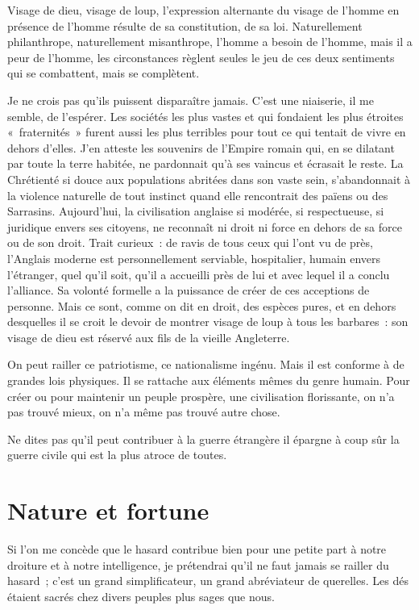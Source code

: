 \documentclass[french,twoside]{book} %
\begin{document}
\noindent Visage de dieu, visage de loup, l’expression alternante du visage de l’homme en présence de l’homme résulte de sa constitution, de sa loi. Naturellement philanthrope, naturellement misanthrope, l’homme a besoin de l’homme, mais il a peur de l’homme, les circonstances règlent seules le jeu de ces deux sentiments qui se combattent, mais se complètent.\par
Je ne crois pas qu’ils puissent disparaître jamais. C’est une niaiserie, il me semble, de l’espérer. Les sociétés les plus vastes et qui fondaient les plus étroites « fraternités » furent aussi les plus terribles pour tout ce qui tentait de vivre en dehors d’elles. J’en atteste les souvenirs de l’Empire romain qui, en se dilatant par toute la terre habitée, ne pardonnait qu’à ses vaincus et écrasait le reste. La Chrétienté si douce aux populations abritées dans son vaste sein, s’abandonnait à la violence naturelle de tout instinct quand elle rencontrait des païens ou des Sarrasins. Aujourd’hui, la civilisation anglaise si modérée, si respectueuse, si juridique envers ses citoyens, ne reconnaît ni droit ni force en dehors de sa force ou de son droit. Trait curieux : de ravis de tous ceux qui l’ont vu de près, l’Anglais moderne est personnellement serviable, hospitalier, humain envers l’étranger, quel qu’il soit, qu’il a accueilli près de lui et avec lequel il a conclu l’alliance. Sa volonté formelle a la puissance de créer de ces acceptions de personne. Mais ce sont, comme on dit en droit, des espèces pures, et en dehors desquelles il se croit le devoir de montrer visage de loup à tous les barbares : son visage de dieu est réservé aux fils de la vieille Angleterre.\par
On peut railler ce patriotisme, ce nationalisme ingénu. Mais il est conforme à de grandes lois physiques. Il se rattache aux éléments mêmes du genre humain. Pour créer ou pour maintenir un peuple prospère, une civilisation florissante, on n’a pas trouvé mieux, on n’a même pas trouvé autre chose.\par
Ne dites pas qu’il peut contribuer à la guerre étrangère il épargne à coup sûr la guerre civile qui est la plus atroce de toutes.
\section[{Nature et fortune}]{Nature et fortune}
\noindent Si l’on me concède que le hasard contribue bien pour une petite part à notre droiture et à notre intelligence, je prétendrai qu’il ne faut jamais se railler du hasard ; c’est un grand simplificateur, un grand abréviateur de querelles. Les dés étaient sacrés chez divers peuples plus sages que nous.\par
\end{document}
